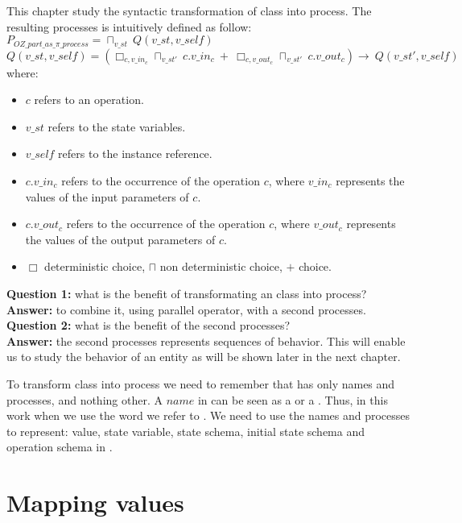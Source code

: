 This chapter study the syntactic transformation of \oz{} class into \picalc{} process. The resulting processes is intuitively defined as follow:\\
$P_{OZ\_part\_as\_\pi\_process} = \sqcap _{v\_st}\ Q(v\_st,v\_self)$\\
$Q(v\_st,v\_self) = (\Box _{c,v\_in_{c}} \sqcap _{v\_st'} \ c.v\_in_{c} \ + \ \Box _{c,v\_out_{c}} \sqcap _{v\_st'} \ c.v\_out_{c})\rightarrow \ Q(v\_st',v\_self)$
where:
\begin{itemize}
\item $c$ refers to an operation.
\item $v\_st$ refers to the state variables.
\item $v\_self$ refers to the instance reference.
\item $c.v\_in_{c}$ refers to the occurrence of the operation $c$, where $v\_in_{c}$ represents the values of the input parameters of $c$.
\item $c.v\_out_{c}$ refers to the occurrence of the operation $c$, where $v\_out_{c}$ represents the values of the output parameters of $c$.
\item $\Box$ deterministic choice, $\sqcap$ non deterministic choice, $+$ choice.
\end{itemize}
\textbf{Question 1:} what is the benefit of transformating an \oz{} class into \picalc{} process?\\
\textbf{Answer:} to combine it, using parallel operator, with a second \picalc{} processes.
\textbf{Question 2:} what is the benefit of the  second processes?\\
\textbf{Answer:} the second processes represents sequences of behavior. This will enable us to study the behavior of an entity as will be shown later in the next chapter.

To transform \oz{} class into \picalc{} process we need to remember that  \picalc{} has only names and processes, and nothing other. A $name$ in \picalc{} can be seen as a  or a . Thus, in this work when we use the word  we refer to \picalc{} . We need to use the names and processes to represent: value, state variable, state schema, initial state schema and operation schema in \picalc{}.
\section{Mapping values}
\label{sec_tra_mapping_values}


